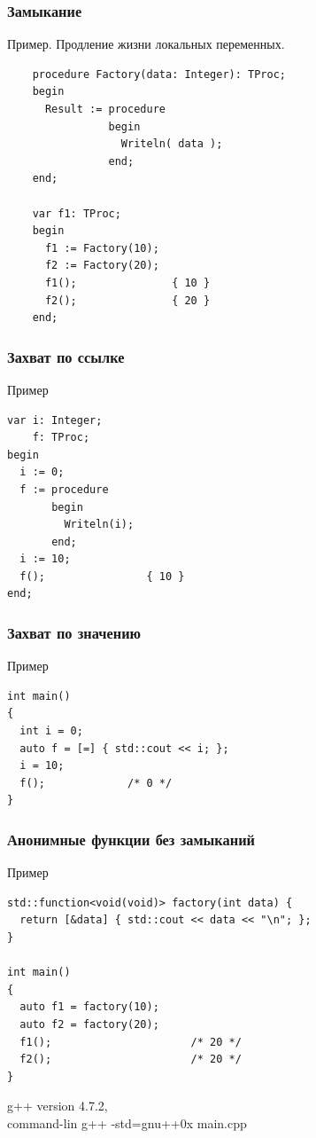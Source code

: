 \documentclass[roman,12pt]{beamer}
\begin{document}
\begin{frame}[fragile]
  \frametitle{Замыкание}
  \begin{block}{Пример. Продление жизни локальных переменных.}
    \begin{lstlisting}
    procedure Factory(data: Integer): TProc;
    begin
      Result := procedure
                begin
                  Writeln( data );
                end;
    end;
    
    var f1: TProc;
    begin
      f1 := Factory(10);
      f2 := Factory(20);
      f1();               { 10 }
      f2();               { 20 }
    end;    
    \end{lstlisting}    
  \end{block} 
\end{frame}

\begin{frame}[fragile]
  \frametitle{Захват по ссылке}
  \begin{block}{Пример}
    \begin{lstlisting}
var i: Integer;
    f: TProc;
begin
  i := 0;
  f := procedure
       begin
         Writeln(i);
       end;
  i := 10;
  f();                { 10 }
end;
    \end{lstlisting}    
 \end{block} 
\end{frame}

\begin{frame}[fragile]
  \frametitle{Захват по значению}
 \begin{block}{Пример}
    \begin{lstlisting}
int main()
{
  int i = 0;
  auto f = [=] { std::cout << i; };
  i = 10;
  f();             /* 0 */
}   
    \end{lstlisting}
  \end{block} 
\end{frame}
  
\begin{frame}[fragile]
  \frametitle{Анонимные функции без замыканий}
 \begin{block}{Пример}
   \begin{lstlisting}
std::function<void(void)> factory(int data) {
  return [&data] { std::cout << data << "\n"; };
}

int main()
{
  auto f1 = factory(10);
  auto f2 = factory(20);
  f1();                      /* 20 */
  f2();                      /* 20 */
}
   \end{lstlisting}
 \end{block} 

g++ version 4.7.2, \\
command-lin g++ -std=gnu++0x main.cpp
 
\end{frame}
\end{document}
